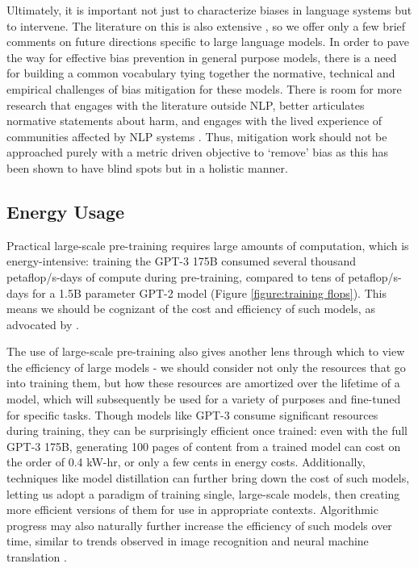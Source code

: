 \documentclass{article}
\begin{document}
Ultimately, it is important not just to characterize biases in language systems but to intervene. The literature on this is also extensive \cite{qian2019reducing,huang2019reducing}, so we offer only a few brief comments on future directions specific to large language models. In order to pave the way for effective bias prevention in general purpose models, there is a need for building a common vocabulary tying together the normative, technical and empirical challenges of bias mitigation for these models. There is room for more research that engages with the literature outside NLP, better articulates normative statements about harm, and engages with the lived experience of communities affected by NLP systems  \cite{blodgett2020language}. Thus, mitigation work should not be approached purely with a metric driven objective to `remove' bias as this has been shown to have blind spots \cite{gonen2019lipstick, nissim2019fair} but in a holistic manner.
 
    \subsection{Energy Usage}
    \label{section:Energy Usage}
    Practical large-scale pre-training requires large amounts of computation, which is energy-intensive: training the GPT-3 175B consumed several thousand petaflop/s-days of compute during pre-training, compared to tens of petaflop/s-days for a 1.5B parameter GPT-2 model (Figure \ref{figure:training flops}). This means we should be cognizant of the cost and efficiency of such models, as advocated by \cite{schwartz2019}. 
   
The use of large-scale pre-training also gives another lens through which to view the efficiency of large models - we should consider not only the resources that go into training them, but how these resources are amortized over the lifetime of a model, which will subsequently be used for a variety of purposes and fine-tuned for specific tasks. Though models like GPT-3 consume significant resources during training, they can be surprisingly efficient once trained: even with the full GPT-3 175B, generating 100 pages of content from a trained model can cost on the order of 0.4 kW-hr, or only a few cents in energy costs. Additionally, techniques like model distillation \cite{liu2019improving} can further bring down the cost of such models, letting us adopt a paradigm of training single, large-scale models, then creating more efficient versions of them for use in appropriate contexts. Algorithmic progress may also naturally further increase the efficiency of such models over time, similar to trends observed in image recognition and neural machine translation \cite{hernandez2020}.
 
\end{document}
